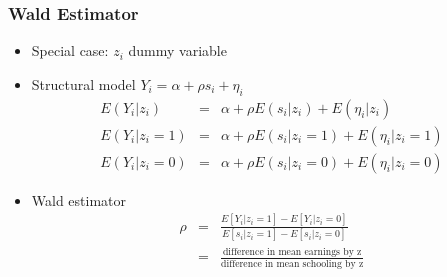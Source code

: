 \documentclass[pdftex]{beamer}
\begin{document}
\begin{frame}
\frametitle{Wald Estimator}
\begin{itemize}
\item Special case:  $z_{i}$ dummy variable
\item Structural model $Y_{i} = \alpha+ \rho s_{i}+ \eta_{i}$
\begin{eqnarray*}
 E(Y_i|z_i) &=&  \alpha + \rho E(s_i|z_i)  +  E(\eta_i|z_i) \\
 E(Y_i|z_i=1) &=&  \alpha  + \rho E(s_i|z_i=1) +  E(\eta_i|z_i=1) \\
 E(Y_i|z_i=0) &=&   \alpha  + \rho E(s_i|z_i=0)+  E(\eta_i|z_i=0) 
\end{eqnarray*}

\item Wald estimator
\begin{eqnarray*}
 \rho &=& \frac{E\left[Y_{i}|z_{i}=1\right]-E\left[Y_{i}|z_{i}=0\right]}{E\left[s_{i}|z_{i}=1\right]-E\left[s_{i}|z_{i}=0\right]} \\
 &=&\frac{\text{difference in mean earnings by z}}{\text {difference in mean schooling by z}}
\end{eqnarray*}

\end {itemize}
\end {frame}
%
%
%
%
\end{document}
